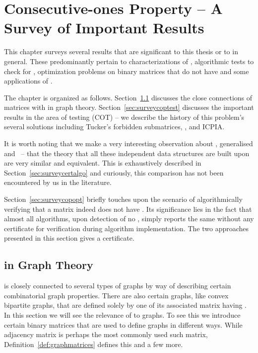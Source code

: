 \xclearpage


\chapter[COP -- A Survey]{Consecutive-ones Property -- A Survey of
  Important Results}
\label{ch:copsurvey}

This chapter surveys several results that are significant to this
thesis or to \COP in general. These predominantly pertain to
characterizations of \COP, algorithmic tests to check for \COP,
optimization problems on binary matrices that do not have \COP and
some applications of \COP.


The chapter is organized as follows. Section~\ref{sec:copgraphtheory}
discusses the close connections of matrices with \COP in graph
theory. Section~\ref{sec:surveycoptest} discusses the important
results in the area of \cop testing (COT) -- we describe the history
of this problem's several solutions including Tucker's forbidden
submatrices, \PQtree, \PQRtree and ICPIA. 

It is worth noting that we make a very interesting observation about
\PQRtree, generalised \PQtree and \gPQtree\ -- that the theory that
all these independent data structures are built upon are very similar
and equivalent. This is exhaustively described in
Section~\ref{sec:surveycertalgo} and curiously, this comparison has
not been encountered by us in the literature.

Section~\ref{sec:surveycopopt} briefly touches upon the scenario of
algorithmically verifying that a matrix indeed does not have \COP. Its
significance lies in the fact that almost all \COT algorithms, upon
detection of no \COP, simply reports the same without any certificate
for verification during algorithm implementation. The two approaches
presented in this section gives a certificate.


\section{\COP in Graph Theory}
\label{sec:copgraphtheory}

\COP is closely connected to several types of graphs by way of
describing certain combinatorial graph properties. There are also
certain graphs, like convex bipartite graphs, that are defined solely
by one of its associated matrix having \COP.  In this section we will
see the relevance of \cop to graphs.  To see this we introduce certain
binary matrices that are used to define graphs in different
ways. While adjacency matrix is perhaps the most commonly used such
matrix, Definition~\ref{def:graphmatrices} defines this and a few
more.

